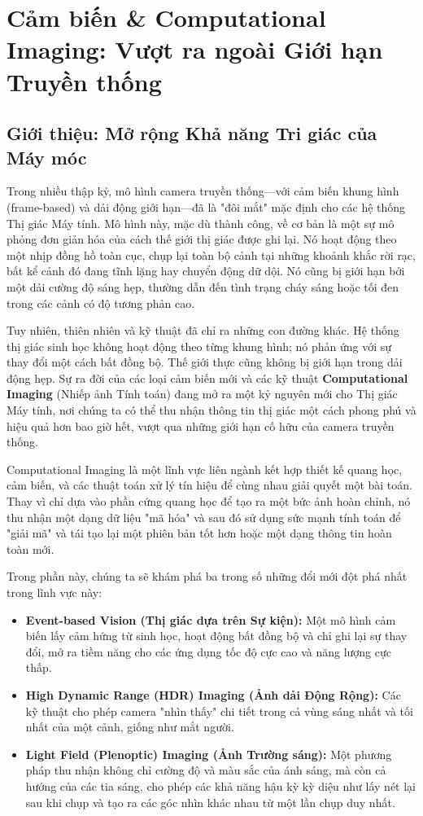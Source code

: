 \section{Cảm biến \& Computational Imaging: Vượt ra ngoài Giới hạn Truyền thống}
\label{sec:advanced_sensors_computational_imaging}

\subsection{Giới thiệu: Mở rộng Khả năng Tri giác của Máy móc}
\label{subsec:advanced_sensors_intro}

Trong nhiều thập kỷ, mô hình camera truyền thống—với cảm biến khung hình (frame-based) và dải động giới hạn—đã là "đôi mắt" mặc định cho các hệ thống Thị giác Máy tính. Mô hình này, mặc dù thành công, về cơ bản là một sự mô phỏng đơn giản hóa của cách thế giới thị giác được ghi lại. Nó hoạt động theo một nhịp đồng hồ toàn cục, chụp lại toàn bộ cảnh tại những khoảnh khắc rời rạc, bất kể cảnh đó đang tĩnh lặng hay chuyển động dữ dội. Nó cũng bị giới hạn bởi một dải cường độ sáng hẹp, thường dẫn đến tình trạng cháy sáng hoặc tối đen trong các cảnh có độ tương phản cao.

Tuy nhiên, thiên nhiên và kỹ thuật đã chỉ ra những con đường khác. Hệ thống thị giác sinh học không hoạt động theo từng khung hình; nó phản ứng với sự thay đổi một cách bất đồng bộ. Thế giới thực cũng không bị giới hạn trong dải động hẹp. Sự ra đời của các loại cảm biến mới và các kỹ thuật \textbf{Computational Imaging} (Nhiếp ảnh Tính toán) đang mở ra một kỷ nguyên mới cho Thị giác Máy tính, nơi chúng ta có thể thu nhận thông tin thị giác một cách phong phú và hiệu quả hơn bao giờ hết, vượt qua những giới hạn cố hữu của camera truyền thống.

Computational Imaging là một lĩnh vực liên ngành kết hợp thiết kế quang học, cảm biến, và các thuật toán xử lý tín hiệu để cùng nhau giải quyết một bài toán. Thay vì chỉ dựa vào phần cứng quang học để tạo ra một bức ảnh hoàn chỉnh, nó thu nhận một dạng dữ liệu "mã hóa" và sau đó sử dụng sức mạnh tính toán để "giải mã" và tái tạo lại một phiên bản tốt hơn hoặc một dạng thông tin hoàn toàn mới.

Trong phần này, chúng ta sẽ khám phá ba trong số những đổi mới đột phá nhất trong lĩnh vực này:
\begin{itemize}
    \item \textbf{Event-based Vision (Thị giác dựa trên Sự kiện):} Một mô hình cảm biến lấy cảm hứng từ sinh học, hoạt động bất đồng bộ và chỉ ghi lại sự thay đổi, mở ra tiềm năng cho các ứng dụng tốc độ cực cao và năng lượng cực thấp.
    \item \textbf{High Dynamic Range (HDR) Imaging (Ảnh dải Động Rộng):} Các kỹ thuật cho phép camera "nhìn thấy" chi tiết trong cả vùng sáng nhất và tối nhất của một cảnh, giống như mắt người.
    \item \textbf{Light Field (Plenoptic) Imaging (Ảnh Trường sáng):} Một phương pháp thu nhận không chỉ cường độ và màu sắc của ánh sáng, mà còn cả hướng của các tia sáng, cho phép các khả năng hậu kỳ kỳ diệu như lấy nét lại sau khi chụp và tạo ra các góc nhìn khác nhau từ một lần chụp duy nhất.
\end{itemize}

